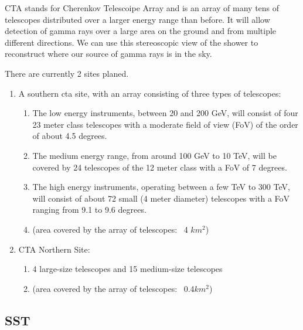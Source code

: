 \documentclass[12pt,article,type=msc,colorback,accentcolor=tud9c]{tudthesis}
\begin{document}

CTA stands for Cherenkov Telescoipe Array and is an array of many tens of telescopes distributed over a larger energy range than before. It will allow detection of gamma rays over a large area on the ground and from multiple different directions. We can use this stereoscopic view of the shower to reconstruct where our source of gamma rays is in the sky.
\newline    

There are currently 2 sites planed.     
\begin{enumerate}
\item A southern cta site, with an array consisting of three types of telescopes:\\
\begin{enumerate}
\item The low energy instruments, between 20 and 200 GeV, will consist of four 23 meter class telescopes with a moderate field of view (FoV) of the order of about 4.5 degrees.
\item The medium energy range, from around 100 GeV to 10 TeV, will be covered by 24 telescopes of the 12 meter class with a FoV of 7 degrees.
\item The high energy instruments, operating between a few TeV to 300 TeV, will consist of about 72 small (4 meter diameter) telescopes with a FoV ranging from 9.1 to 9.6 degrees.
\item  (area covered by the array of telescopes: ~4 $km^2$)\\
\end{enumerate}
\item CTA Northern Site:
\begin{enumerate} 
\item 4 large-size telescopes and 15 medium-size telescopes
\item (area covered by the array of telescopes: ~0.4$ km^2$)
\end{enumerate}
\end{enumerate}
\subsection{SST}
\end{document}
